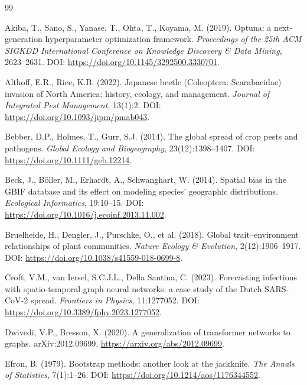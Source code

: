 \documentclass[a4paper,fleqn]{cas-sc}
\begin{document}
\begin{thebibliography}{99}

 Akiba, T., Sano, S., Yanase, T., Ohta, T., Koyama, M. (2019). Optuna: a next-generation hyperparameter optimization framework. \textit{Proceedings of the 25th ACM SIGKDD International Conference on Knowledge Discovery \& Data Mining}, 2623--2631. DOI: \url{https://doi.org/10.1145/3292500.3330701}.

 Althoff, E.R., Rice, K.B. (2022). Japanese beetle (Coleoptera: Scarabaeidae) invasion of North America: history, ecology, and management. \textit{Journal of Integrated Pest Management}, 13(1):2. DOI: \url{https://doi.org/10.1093/jipm/pmab043}.

 Bebber, D.P., Holmes, T., Gurr, S.J. (2014). The global spread of crop pests and pathogens. \textit{Global Ecology and Biogeography}, 23(12):1398--1407. DOI: \url{https://doi.org/10.1111/geb.12214}.

 Beck, J., B\"oller, M., Erhardt, A., Schwanghart, W. (2014). Spatial bias in the GBIF database and its effect on modeling species' geographic distributions. \textit{Ecological Informatics}, 19:10--15. DOI: \url{https://doi.org/10.1016/j.ecoinf.2013.11.002}.

 Bruelheide, H., Dengler, J., Purschke, O., et al. (2018). Global trait--environment relationships of plant communities. \textit{Nature Ecology \& Evolution}, 2(12):1906--1917. DOI: \url{https://doi.org/10.1038/s41559-018-0699-8}.

 Croft, V.M., van Iersel, S.C.J.L., Della Santina, C. (2023). Forecasting infections with spatio-temporal graph neural networks: a case study of the Dutch SARS-CoV-2 spread. \textit{Frontiers in Physics}, 11:1277052. DOI: \url{https://doi.org/10.3389/fphy.2023.1277052}.

 Dwivedi, V.P., Bresson, X. (2020). A generalization of transformer networks to graphs. arXiv:2012.09699. \url{https://arxiv.org/abs/2012.09699}.

 Efron, B. (1979). Bootstrap methods: another look at the jackknife. \textit{The Annals of Statistics}, 7(1):1--26. DOI: \url{https://doi.org/10.1214/aos/1176344552}.


\end{thebibliography}
\end{document}

